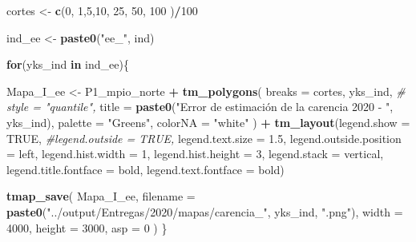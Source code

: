 \documentclass[
  12pt,
]{book}
\newenvironment{Shaded}{\begin{snugshade}}{\end{snugshade}}
\newcommand{\AttributeTok}[1]{\textcolor[rgb]{0.13,0.29,0.53}{#1}}
\newcommand{\CommentTok}[1]{\textcolor[rgb]{0.56,0.35,0.01}{\textit{#1}}}
\newcommand{\ConstantTok}[1]{\textcolor[rgb]{0.56,0.35,0.01}{#1}}
\newcommand{\ControlFlowTok}[1]{\textcolor[rgb]{0.13,0.29,0.53}{\textbf{#1}}}
\newcommand{\DecValTok}[1]{\textcolor[rgb]{0.00,0.00,0.81}{#1}}
\newcommand{\FloatTok}[1]{\textcolor[rgb]{0.00,0.00,0.81}{#1}}
\newcommand{\FunctionTok}[1]{\textcolor[rgb]{0.13,0.29,0.53}{\textbf{#1}}}
\newcommand{\NormalTok}[1]{#1}
\newcommand{\OtherTok}[1]{\textcolor[rgb]{0.56,0.35,0.01}{#1}}
\newcommand{\SpecialCharTok}[1]{\textcolor[rgb]{0.81,0.36,0.00}{\textbf{#1}}}
\newcommand{\StringTok}[1]{\textcolor[rgb]{0.31,0.60,0.02}{#1}}
\begin{document}
\begin{Shaded}
\begin{Highlighting}[]
\NormalTok{cortes }\OtherTok{\textless{}{-}} \FunctionTok{c}\NormalTok{(}\DecValTok{0}\NormalTok{,  }\DecValTok{1}\NormalTok{,}\DecValTok{5}\NormalTok{,}\DecValTok{10}\NormalTok{, }\DecValTok{25}\NormalTok{,  }\DecValTok{50}\NormalTok{,  }\DecValTok{100}\NormalTok{ )}\SpecialCharTok{/}\DecValTok{100}

\NormalTok{ind\_ee }\OtherTok{\textless{}{-}} \FunctionTok{paste0}\NormalTok{(}\StringTok{"ee\_"}\NormalTok{, ind)}

\ControlFlowTok{for}\NormalTok{(yks\_ind }\ControlFlowTok{in}\NormalTok{ ind\_ee)\{}

\NormalTok{  Mapa\_I\_ee }\OtherTok{\textless{}{-}}
\NormalTok{  P1\_mpio\_norte }\SpecialCharTok{+} \FunctionTok{tm\_polygons}\NormalTok{(}
    \AttributeTok{breaks  =}\NormalTok{ cortes,}
\NormalTok{    yks\_ind,}
    \CommentTok{\# style = "quantile",}
    \AttributeTok{title =} \FunctionTok{paste0}\NormalTok{(}\StringTok{"Error de estimación de la carencia 2020 {-} "}\NormalTok{, yks\_ind),}
    \AttributeTok{palette =} \StringTok{"Greens"}\NormalTok{,}
    \AttributeTok{colorNA =} \StringTok{"white"}
\NormalTok{  ) }\SpecialCharTok{+} \FunctionTok{tm\_layout}\NormalTok{(}\AttributeTok{legend.show =} \ConstantTok{TRUE}\NormalTok{,}
                \CommentTok{\#legend.outside = TRUE,}
                \AttributeTok{legend.text.size =}  \FloatTok{1.5}\NormalTok{, }
                \AttributeTok{legend.outside.position =} \StringTok{\textquotesingle{}left\textquotesingle{}}\NormalTok{,}
                \AttributeTok{legend.hist.width =} \DecValTok{1}\NormalTok{,}
                \AttributeTok{legend.hist.height =} \DecValTok{3}\NormalTok{,}
                \AttributeTok{legend.stack =} \StringTok{\textquotesingle{}vertical\textquotesingle{}}\NormalTok{,}
                \AttributeTok{legend.title.fontface =} \StringTok{\textquotesingle{}bold\textquotesingle{}}\NormalTok{,}
                \AttributeTok{legend.text.fontface =} \StringTok{\textquotesingle{}bold\textquotesingle{}}\NormalTok{) }


\FunctionTok{tmap\_save}\NormalTok{(}
\NormalTok{  Mapa\_I\_ee,}
  \AttributeTok{filename =}  \FunctionTok{paste0}\NormalTok{(}\StringTok{"../output/Entregas/2020/mapas/carencia\_"}\NormalTok{, yks\_ind, }\StringTok{".png"}\NormalTok{),}
  \AttributeTok{width =} \DecValTok{4000}\NormalTok{,}
  \AttributeTok{height =} \DecValTok{3000}\NormalTok{,}
  \AttributeTok{asp =} \DecValTok{0}
\NormalTok{)}
\NormalTok{\}}
\end{Highlighting}
\end{Shaded}
\end{document}
